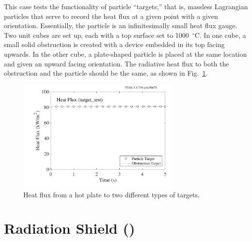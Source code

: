 \documentclass[11pt]{book}
\begin{document}
This case tests the functionality of particle ``targets;'' that is, massless Lagrangian particles that serve to record the heat flux at a given point with a given orientation. Essentially, the particle is an infinitesimally small heat flux gauge. Two unit cubes are set up, each with a top surface set to 1000~$^\circ$C. In one cube, a small solid obstruction is created with a device embedded in its top facing upwards. In the other cube, a plate-shaped particle is placed at the same location and given an upward facing orientation. The radiative heat flux to both the obstruction and the particle should be the same, as shown in Fig.~\ref{target_test_plot}.
\noindent
\begin{figure}[h]
\begin{center}
\includegraphics[width=3.2in]{SCRIPT_FIGURES/target_test}
\end{center}
\caption[The  case]{Heat flux from a hot plate to two different types of targets.}
\label{target_test_plot}
\end{figure}


\clearpage

\section{Radiation Shield (\texorpdfstring{}{radiation\_shield}) }
\label{radiation_shield}
\end{document}
